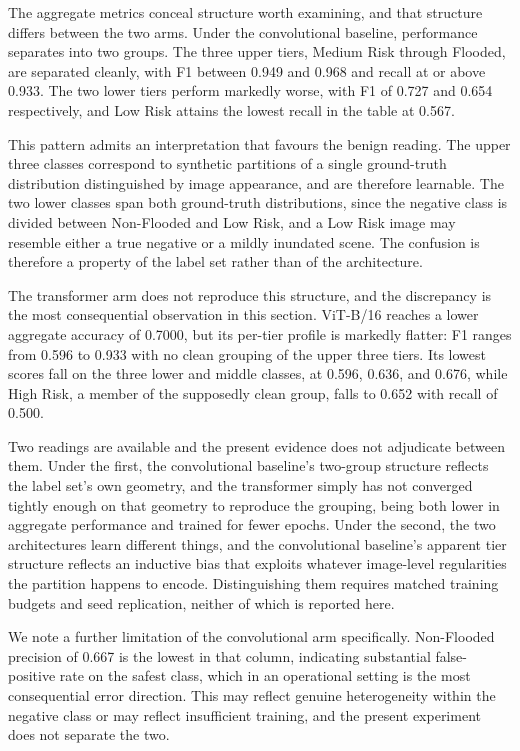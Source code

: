 \documentclass[11pt,journal]{IEEEtran}
\begin{document}
The aggregate metrics conceal structure worth examining, and that structure
differs between the two arms. Under the convolutional baseline, performance
separates into two groups. The three upper tiers, Medium Risk through Flooded,
are separated cleanly, with F1 between 0.949 and 0.968 and recall at or above
0.933. The two lower tiers perform markedly worse, with F1 of 0.727 and 0.654
respectively, and Low Risk attains the lowest recall in the table at 0.567.

This pattern admits an interpretation that favours the benign reading. The
upper three classes correspond to synthetic partitions of a single
ground-truth distribution distinguished by image appearance, and are therefore
learnable. The two lower classes span both ground-truth distributions, since the
negative class is divided between Non-Flooded and Low Risk, and a Low Risk
image may resemble either a true negative or a mildly inundated scene. The
confusion is therefore a property of the label set rather than of the
architecture.

The transformer arm does not reproduce this structure, and the discrepancy is
the most consequential observation in this section. ViT-B/16 reaches a lower
aggregate accuracy of 0.7000, but its per-tier profile is markedly flatter: F1
ranges from 0.596 to 0.933 with no clean grouping of the upper three tiers. Its
lowest scores fall on the three lower and middle classes, at 0.596, 0.636, and
0.676, while High Risk, a member of the supposedly clean group, falls to 0.652
with recall of 0.500.

Two readings are available and the present evidence does not adjudicate between
them. Under the first, the convolutional baseline's two-group structure
reflects the label set's own geometry, and the transformer simply has not
converged tightly enough on that geometry to reproduce the grouping, being both
lower in aggregate performance and trained for fewer epochs. Under the second,
the two architectures learn different things, and the convolutional baseline's
apparent tier structure reflects an inductive bias that exploits whatever
image-level regularities the partition happens to encode. Distinguishing them
requires matched training budgets and seed replication, neither of which is
reported here.

We note a further limitation of the convolutional arm specifically.
Non-Flooded precision of 0.667 is the lowest in that column, indicating
substantial false-positive rate on the safest class, which in an operational
setting is the most consequential error direction. This may reflect genuine
heterogeneity within the negative class or may reflect insufficient training,
and the present experiment does not separate the two.
\end{document}
